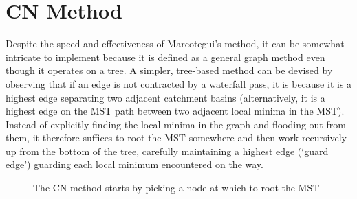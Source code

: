 \documentclass[preprint,a4paper]{elsarticle}
\newenvironment{stusubfig}[1]
{
	\begin{figure}[#1]
	\begin{center}
}
{
	\end{center}
	\end{figure}
}
\begin{document}
\section{CN Method}
\label{sec:nicholls}

Despite the speed and effectiveness of Marcotegui's method, it can be somewhat intricate to implement \cite{golodetz08} because it is defined as a general graph method even though it operates on a tree. A simpler, tree-based method can be devised by observing that if an edge is not contracted by a waterfall pass, it is because it is a highest edge separating two adjacent catchment basins (alternatively, it is a highest edge on the MST path between two adjacent local minima in the MST). Instead of explicitly finding the local minima in the graph and flooding out from them, it therefore suffices to root the MST somewhere and then work recursively up from the bottom of the tree, carefully maintaining a highest edge (`guard edge') guarding each local minimum encountered on the way.

\begin{stusubfig}{p}
	\hspace{4mm}%
\caption{The CN method starts by picking a node at which to root the MST}%
\label{fig:segmentation-waterfall-nicholls-root}
\end{stusubfig}
\end{document}
